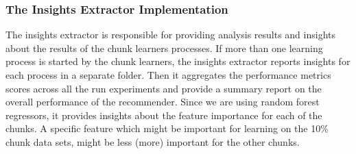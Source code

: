 \subsubsection*{The Insights Extractor Implementation}
\label{InsightsExtractorImplementation}
The insights extractor is responsible for providing analysis results and insights about the results of the chunk learners processes.
If more than one learning process is started by the chunk learners, the insights extractor reports insights for each process in a separate folder.
Then it aggregates the performance metrics scores across all the run experiments and provide a summary report on the overall performance of the recommender.
Since we are using random forest regressors, it provides insights about the feature importance for each of the chunks.
A specific feature which might be important for learning on the 10\% chunk data sets, might be less (more) important for the other chunks.